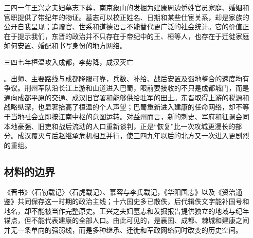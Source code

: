 三四一年王兴之夫妇墓志下葬，南京象山的发掘为建康周边侨姓官员家庭、婚姻和官职提供了带纪年的物证。墓志可以校正姓名、日期和某些仕宦关系，却是家族的公开自我呈现；追赠官、世系和道德语言不能替代更广泛的社会统计。它的价值正在于提示我们，东晋的政治并不只存在于帝纪中的王、桓等人，也存在于迁徙家庭如何安置、婚配和书写身份的地方网络。

\hypertarget{evt:JH-0347-CHENGHAN-FALL}{\textcolor{dynasty}{三四七年桓温攻入成都，李势降，成汉灭亡}}。出师、主要路线与成都降服可靠，兵数、补给、战后安置及蜀地整合的速度均有争议。荆州军队沿长江上游和山道进入巴蜀，眼前要接收的不只是成都城门，而是通向成都平原的交通、成汉旧官署和能够供给驻军的田土。东晋取得上游的税源和战略纵深，也显著抬高了桓温的个人声望；巴蜀重新进入建康的任命网络，却不等于当地社会立即按江南中枢的意图运转。对益州而言，新的刺史、军府和征调会同本地豪强、旧吏和战后流动的人口重新谈判，正是“恢复”比一次攻城更漫长的部分。成汉覆灭与后赵继承危机相互并行，使三四九年以后的北方又一次进入更剧烈的重组。

\subsection{材料的边界}

《晋书》〈石勒载记〉〈石虎载记〉、慕容与李氏载记，《华阳国志》以及《资治通鉴》共同保存这一时期的政治主线；十六国史多已散佚，后代辑佚文字能补国号和地名，却不能被当作完整原史。王兴之夫妇墓志和发掘报告提供独立的地域与纪年锚点，但不能代表建康的全部人口。由此可见的，是襄国、成都、棘城和建康之间并无一条单向的强弱线，而是多种继承、迁徙和军政网络同时改变的历史空间。
